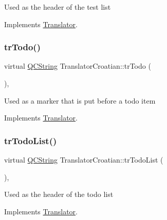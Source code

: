 Used as the header of the test list 

Implements \mbox{\hyperlink{class_translator}{Translator}}.

\mbox{\label{class_translator_croatian_a621cab979eb5858c3f91983c0d30d986}} 
\subsubsection{\texorpdfstring{trTodo()}{trTodo()}}
{\footnotesize\ttfamily virtual \mbox{\hyperlink{class_q_c_string}{Q\+C\+String}} Translator\+Croatian\+::tr\+Todo (\begin{DoxyParamCaption}{ }\end{DoxyParamCaption})\hspace{0.3cm}{\ttfamily [inline]}, {\ttfamily [virtual]}}

Used as a marker that is put before a todo item 

Implements \mbox{\hyperlink{class_translator}{Translator}}.

\mbox{\label{class_translator_croatian_a2405bbb107f6f5b2b63ec014d096fdc1}} 
\subsubsection{\texorpdfstring{trTodoList()}{trTodoList()}}
{\footnotesize\ttfamily virtual \mbox{\hyperlink{class_q_c_string}{Q\+C\+String}} Translator\+Croatian\+::tr\+Todo\+List (\begin{DoxyParamCaption}{ }\end{DoxyParamCaption})\hspace{0.3cm}{\ttfamily [inline]}, {\ttfamily [virtual]}}

Used as the header of the todo list 

Implements \mbox{\hyperlink{class_translator}{Translator}}.

\mbox{\label{class_translator_croatian_ac2d6cc18fc740ca01b2ad50d747c9935}} 
